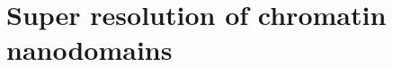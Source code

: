 \documentclass{beamer}					%
\begin{document}

\section{Super resolution of chromatin nanodomains}

\end{document}
